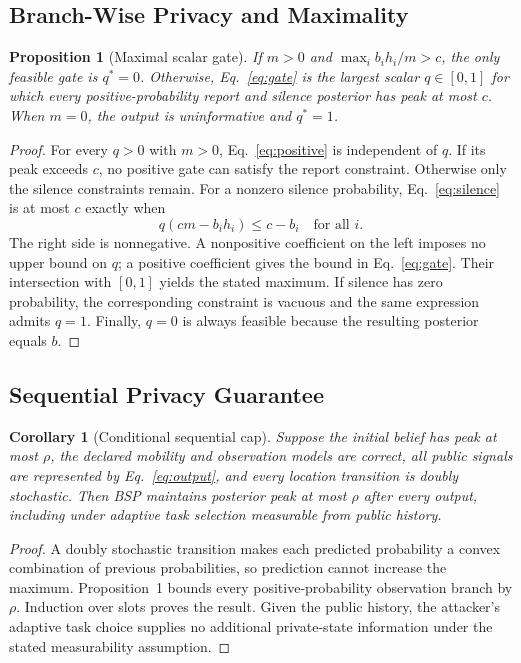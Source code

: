 \documentclass[10pt,journal,compsoc]{IEEEtran}
\newtheorem{proposition}{Proposition}
\newtheorem{corollary}{Corollary}
\begin{document}
\subsection{Branch-Wise Privacy and Maximality}
\begin{proposition}[Maximal scalar gate]
If $m>0$ and $\max_i b_i h_i/m>c$, the only feasible gate is $q^*=0$. Otherwise, Eq.~\eqref{eq:gate} is the largest scalar $q\in[0,1]$ for which every positive-probability report and silence posterior has peak at most $c$. When $m=0$, the output is uninformative and $q^*=1$.
\end{proposition}
\begin{proof}
For every $q>0$ with $m>0$, Eq.~\eqref{eq:positive} is independent of $q$. If its peak exceeds $c$, no positive gate can satisfy the report constraint. Otherwise only the silence constraints remain. For a nonzero silence probability, Eq.~\eqref{eq:silence} is at most $c$ exactly when
\begin{equation}
 q(cm-b_i h_i)\le c-b_i\quad\text{for all }i.
\end{equation}
The right side is nonnegative. A nonpositive coefficient on the left imposes no upper bound on $q$; a positive coefficient gives the bound in Eq.~\eqref{eq:gate}. Their intersection with $[0,1]$ yields the stated maximum. If silence has zero probability, the corresponding constraint is vacuous and the same expression admits $q=1$. Finally, $q=0$ is always feasible because the resulting posterior equals $b$.
\end{proof}

\subsection{Sequential Privacy Guarantee}
\begin{corollary}[Conditional sequential cap]
Suppose the initial belief has peak at most $\rho$, the declared mobility and observation models are correct, all public signals are represented by Eq.~\eqref{eq:output}, and every location transition is doubly stochastic. Then BSP maintains posterior peak at most $\rho$ after every output, including under adaptive task selection measurable from public history.
\end{corollary}
\begin{proof}
A doubly stochastic transition makes each predicted probability a convex combination of previous probabilities, so prediction cannot increase the maximum. Proposition~1 bounds every positive-probability observation branch by $\rho$. Induction over slots proves the result. Given the public history, the attacker's adaptive task choice supplies no additional private-state information under the stated measurability assumption.
\end{proof}
\end{document}
